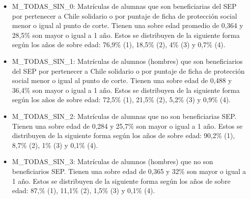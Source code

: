 \begin{itemize}
  \item M\_TODAS\_SIN\_0: Matrículas de alumnas que son beneficiarias del SEP por pertenecer a Chile solidario o por puntaje de ficha de protección social menor o igual al punto de corte. Tienen una sobre edad promedio de 0,364 y 28,5\% son mayor o igual a 1 año. Estos se distribuyen de la siguiente forma según los años de sobre edad: 76,9\% (1), 18,5\% (2), 4\% (3) y 0,7\% (4).
  \item M\_TODAS\_SIN\_1: Matrículas de alumnos (hombres) que son beneficiarios del SEP por pertenecer a Chile solidario o por puntaje de ficha de protección social menor o igual al punto de corte. Tienen una sobre edad de 0,488 y 36,4\% son mayor o igual a 1 año. Estos se distribuyen de la siguiente forma según los años de sobre edad: 72,5\% (1), 21,5\% (2), 5,2\% (3) y 0,9\% (4).
  \item M\_TODAS\_SIN\_2: Matrículas de alumnas que no son beneficiarias SEP. Tienen una sobre edad de 0,284 y 25,7\% son mayor o igual a 1 año. Estos se distribuyen de la siguiente forma según los años de sobre edad: 90,2\% (1), 8,7\% (2), 1\% (3) y 0,1\% (4).

  \item M\_TODAS\_SIN\_3: Matrículas de alumnos (hombres) que no son beneficiarios SEP. Tienen una sobre edad de 0,365 y 32\% son mayor o igual a 1 año. Estos se distribuyen de la siguiente forma según los años de sobre edad: 87,\% (1), 11,1\% (2), 1,5\% (3) y 0,1\% (4).
\end{itemize}

